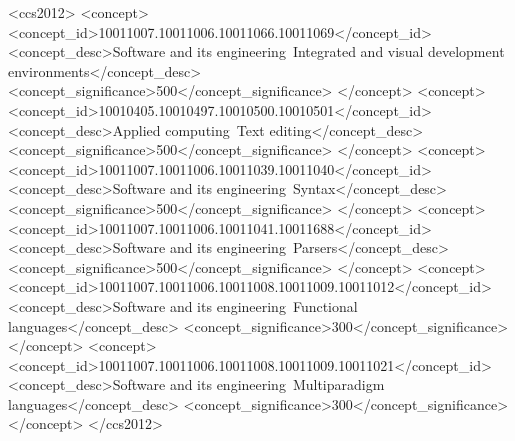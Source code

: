 \documentclass{sig-alternate-05-2015}
\def\inputtex#1{}
\begin{document}
\begin{CCSXML}
<ccs2012>
<concept>
<concept_id>10011007.10011006.10011066.10011069</concept_id>
<concept_desc>Software and its engineering~Integrated and visual development environments</concept_desc>
<concept_significance>500</concept_significance>
</concept>
<concept>
<concept_id>10010405.10010497.10010500.10010501</concept_id>
<concept_desc>Applied computing~Text editing</concept_desc>
<concept_significance>500</concept_significance>
</concept>
<concept>
<concept_id>10011007.10011006.10011039.10011040</concept_id>
<concept_desc>Software and its engineering~Syntax</concept_desc>
<concept_significance>500</concept_significance>
</concept>
<concept>
<concept_id>10011007.10011006.10011041.10011688</concept_id>
<concept_desc>Software and its engineering~Parsers</concept_desc>
<concept_significance>500</concept_significance>
</concept>
<concept>
<concept_id>10011007.10011006.10011008.10011009.10011012</concept_id>
<concept_desc>Software and its engineering~Functional languages</concept_desc>
<concept_significance>300</concept_significance>
</concept>
<concept>
<concept_id>10011007.10011006.10011008.10011009.10011021</concept_id>
<concept_desc>Software and its engineering~Multiparadigm languages</concept_desc>
<concept_significance>300</concept_significance>
</concept>
</ccs2012>

\end{CCSXML}

\printccsdesc

\keywords{\commonlisp{}}

\inputtex{sec-introduction.tex}
\inputtex{sec-previous.tex}
\inputtex{sec-our-method.tex}
\inputtex{sec-performance.tex}
\inputtex{sec-conclusions.tex}
\inputtex{sec-acknowledgements.tex}



\appendix
\inputtex{app-details.tex}
\inputtex{app-reader-modification.tex}
\end{document}
